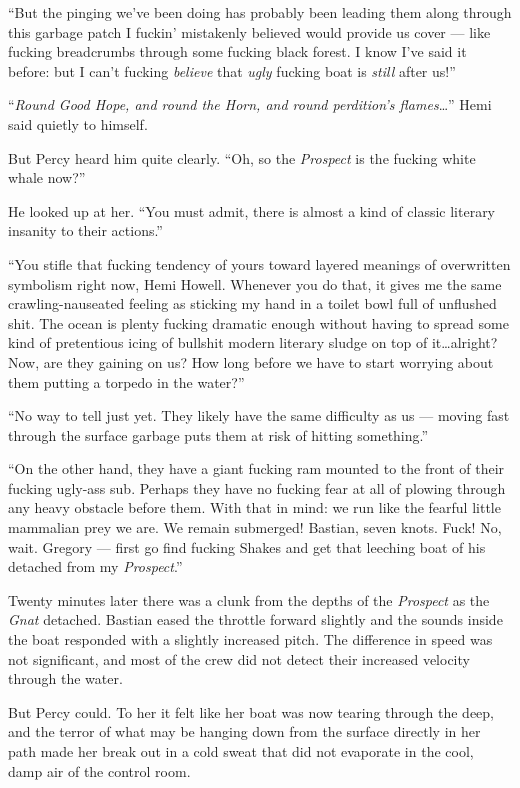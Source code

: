 \documentclass[
]{scrbook}
\begin{document}
``But the pinging we've been doing has probably been leading them along
through this garbage patch I fuckin' mistakenly believed would provide
us cover --- like fucking breadcrumbs through some fucking black forest.
I know I've said it before: but I can't fucking \emph{believe} that
\emph{ugly} fucking boat is \emph{still} after us!''

``\emph{Round Good Hope, and round the Horn, and round perdition's
flames}\ldots{}'' Hemi said quietly to himself.

But Percy heard him quite clearly. ``Oh, so the \emph{Prospect} is the
fucking white whale now?''

He looked up at her. ``You must admit, there is almost a kind of classic
literary insanity to their actions.''

``You stifle that fucking tendency of yours toward layered meanings of
overwritten symbolism right now, Hemi Howell. Whenever you do that, it
gives me the same crawling-nauseated feeling as sticking my hand in a
toilet bowl full of unflushed shit. The ocean is plenty fucking dramatic
enough without having to spread some kind of pretentious icing of
bullshit modern literary sludge on top of it\ldots alright? Now, are
they gaining on us? How long before we have to start worrying about them
putting a torpedo in the water?''

``No way to tell just yet. They likely have the same difficulty as us
--- moving fast through the surface garbage puts them at risk of hitting
something.''

``On the other hand, they have a giant fucking ram mounted to the front
of their fucking ugly-ass sub. Perhaps they have no fucking fear at all
of plowing through any heavy obstacle before them. With that in mind: we
run like the fearful little mammalian prey we are. We remain submerged!
Bastian, seven knots. Fuck! No, wait. Gregory --- first go find fucking
Shakes and get that leeching boat of his detached from my
\emph{Prospect}.''

Twenty minutes later there was a clunk from the depths of the
\emph{Prospect} as the \emph{Gnat} detached. Bastian eased the throttle
forward slightly and the sounds inside the boat responded with a
slightly increased pitch. The difference in speed was not significant,
and most of the crew did not detect their increased velocity through the
water.

But Percy could. To her it felt like her boat was now tearing through
the deep, and the terror of what may be hanging down from the surface
directly in her path made her break out in a cold sweat that did not
evaporate in the cool, damp air of the control room.
\end{document}
